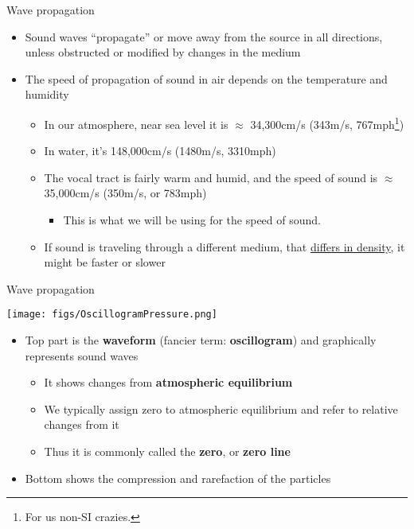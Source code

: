 \documentclass[professionalfonts]{beamer}
\begin{document}
\begin{frame}{Wave propagation}
    \begin{itemize}
        \item Sound waves “propagate” or move away from the source in all directions, unless obstructed or modified by changes in the medium
        \item The speed of propagation of sound in air depends on the temperature and humidity
        \begin{itemize}
            \item In our atmosphere, near sea level it is $\approx$ 34,300cm/s (343m/s, 767mph\footnote{For us non-SI crazies.})
            \item In water, it's 148,000cm/s (1480m/s, 3310mph)
            \item The vocal tract is fairly warm and humid, and the speed of sound is $\approx $35,000cm/s (350m/s, or 783mph)
            \begin{itemize}
                \item This is what we will be using for the speed of sound. 
            \end{itemize}
            \item If sound is traveling through a different medium, that \href{https://youtu.be/d-XbjFn3aqE?si=3AE-7EA5ck7BWhJa}{differs in density}, it might be faster or slower 
        \end{itemize}
    \end{itemize}
\end{frame}

\begin{frame}{Wave propagation}
    \begin{center}
        \texttt{[image: figs/OscillogramPressure.png]}
    \end{center}
    \begin{itemize}
        \item Top part is the \textbf{waveform} (fancier term: \textbf{oscillogram}) and graphically represents sound waves
        \begin{itemize}
            \item It shows changes from \textbf{atmospheric equilibrium} 
            \item We typically assign zero to atmospheric equilibrium and refer to relative changes from it 
            \item Thus it is commonly called the \textbf{zero}, or \textbf{zero line}
        \end{itemize}
        \item Bottom shows the compression and rarefaction of the particles
    \end{itemize}
\end{frame}
\end{document}
